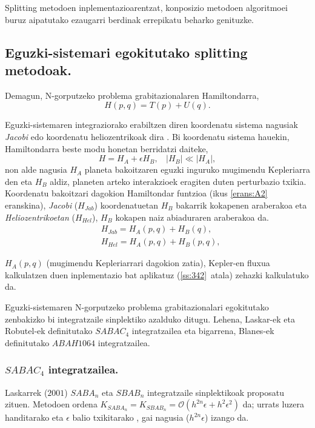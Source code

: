 Splitting metodoen inplementazioarentzat, konposizio metodoen algoritmoei buruz aipatutako ezaugarri berdinak errepikatu beharko genituzke. 

\subsection{Eguzki-sistemari egokitutako splitting metodoak.}

Demagun, N-gorputzeko problema grabitazionalaren Hamiltondarra,
\begin{equation*}
H(p,q)=T(p)+U(q).
\end{equation*}

Eguzki-sistemaren integraziorako erabiltzen diren koordenatu sistema nagusiak \emph{Jacobi} edo koordenatu heliozentrikoak dira \cite{Wisdom2006,Farres2013}.  Bi koordenatu sistema hauekin, Hamiltondarra beste modu honetan berridatzi daiteke,
\begin{equation*}
H=H_A+\epsilon H_B,  \ \ \ \ |H_B|\ll|H_A|,
\end{equation*}
non alde nagusia $H_A$ planeta bakoitzaren eguzki inguruko mugimendu Kepleriarra den eta $H_B$ aldiz, planeten arteko interakzioek eragiten duten perturbazio txikia. Koordenatu bakoitzari dagokion Hamiltondar funtzioa (ikus \ref{erans:A2} eranskina), \emph{Jacobi} ($H_{Jab}$) koordenatuetan $H_B$ bakarrik kokapenen araberakoa eta \emph{Heliozentrikoetan} ($H_{Hel}$), $H_B$ kokapen naiz abiaduraren araberakoa da.
\begin{align*}
&H_{Jab}=H_A(p,q)+H_B(q), \\
&H_{Hel}=H_A(p,q)+H_B(p,q), 
\end{align*}       

$H_A(p,q)$ (mugimendu Kepleriarrari dagokion zatia), Kepler-en fluxua kalkulatzen duen inplementazio bat aplikatuz (\ref{ss:342}~atala) zehazki kalkulatuko da.

Eguzki-sistemaren N-gorputzeko problema grabitazionalari egokitutako zenbakizko bi integratzaile sinplektiko azalduko ditugu. Lehena, Laskar-ek eta Robutel-ek \cite{Laskar2001} definitutako \emph{$SABAC_4$} integratzailea eta bigarrena, Blanes-ek \cite{Blanes2013,Farres2013} definitutako \emph{$ABAH1064$} integratzailea. 


\subsubsection*{$SABAC_4$ integratzailea.}

Laskarrek ($2001$) $SABA_n$ eta $SBAB_n$ integratzaile sinplektikoak \cite{Laskar2001} proposatu zituen. Metodoen ordena $K_{SABA_n}=K_{SBAB_n}=\mathcal{O}(h^{2n} \epsilon+ h^2 \epsilon^2)$ da; urrats luzera handitarako eta $\epsilon$ balio txikitarako , gai nagusia ($h^{2n} \epsilon$) izango da.

